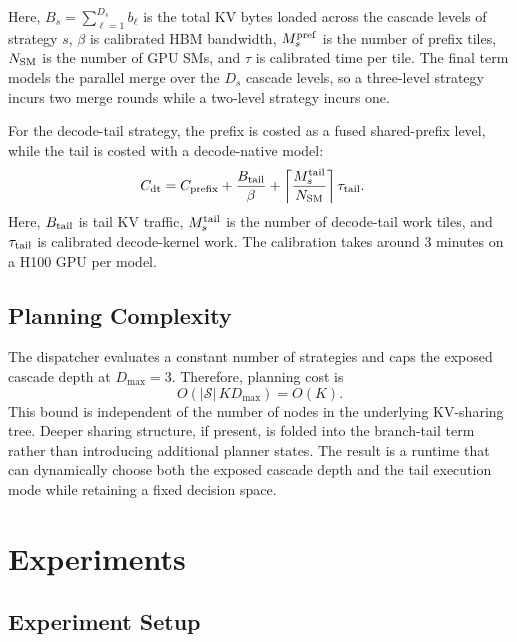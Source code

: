 \documentclass[11pt]{article}
\begin{document}
Here, $B_s = \sum_{\ell=1}^{D_s} b_\ell$ is the total KV bytes loaded across
the cascade levels of strategy $s$, $\beta$ is calibrated HBM bandwidth,
$M_s^{\rm pref}$ is the number of prefix tiles, $N_{\rm SM}$ is the number of
GPU SMs, and $\tau$ is calibrated time per tile. The final term models the parallel merge over the $D_s$ cascade levels, so a three-level strategy incurs two merge rounds while a two-level strategy incurs one.

For the decode-tail strategy, the prefix is costed as a fused shared-prefix
level, while the tail is costed with a decode-native model:
\begin{equation}
\label{eq:dectail-tail}
\begin{aligned}
C_{\rm dt}
&=
C_{\rm prefix}
+
\frac{B_{\rm tail}}{\beta}
+
\left\lceil
\frac{M_s^{\rm tail}}{N_{\rm SM}}
\right\rceil
\tau_{\rm tail}.
\end{aligned}
\end{equation}
Here, $B_{\rm tail}$ is tail KV traffic, $M_s^{\rm tail}$ is the number of
decode-tail work tiles, and $\tau_{\rm tail}$ is calibrated decode-kernel work. The calibration takes around 3 minutes on a H100 GPU per model. 

\subsection{Planning Complexity}

The dispatcher evaluates a constant number of strategies and caps the exposed
cascade depth at $D_{\max}=3$. Therefore, planning cost is
\begin{equation}
\label{eq:complexity}
O(|\mathcal{S}|\, K D_{\max})
=
O(K).
\end{equation}
This bound is independent of the number of nodes in the underlying KV-sharing
tree. Deeper sharing structure, if present, is folded into the branch-tail
term rather than introducing additional planner states. The result is a runtime that can dynamically choose both the exposed cascade
depth and the tail execution mode while retaining a fixed decision space.

\section{Experiments}
\subsection{Experiment Setup}
\end{document}
